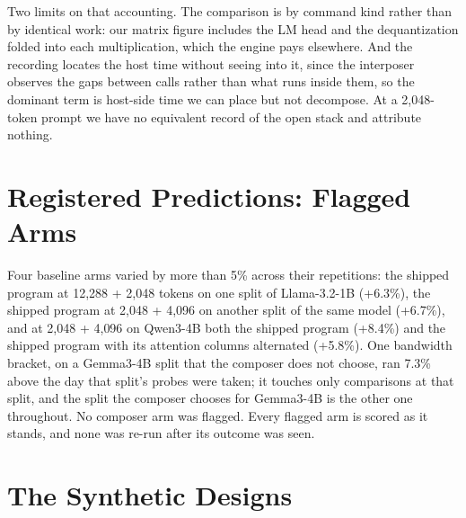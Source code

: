 \documentclass{article}
\begin{document}
Two limits on that accounting. The comparison is by command kind rather than by identical work: our matrix figure
includes the LM head and the dequantization folded into each multiplication, which the engine pays
elsewhere. And the recording locates the host time without seeing into it, since the interposer observes the gaps
between calls rather than what runs inside them, so the dominant term is host-side time we can place but not
decompose. At a 2{,}048-token prompt we have no equivalent record of the open stack and attribute nothing.
\section{Registered Predictions: Flagged Arms}
\label{app:flags}

Four baseline arms varied by more than 5\% across their repetitions: the shipped program at 12{,}288 + 2{,}048 tokens on
one split of Llama-3.2-1B (+6.3\%), the shipped program at 2{,}048 + 4{,}096 on another split of the same model
(+6.7\%), and at 2{,}048 + 4{,}096 on Qwen3-4B both the shipped program (+8.4\%) and the shipped program with its
attention columns alternated (+5.8\%). One bandwidth bracket, on a Gemma3-4B split that the composer does not choose,
ran 7.3\% above the day that split's probes were taken; it touches only comparisons at that split, and the split the
composer chooses for Gemma3-4B is the other one throughout. No composer arm was flagged. Every flagged arm is scored
as it stands, and none was re-run after its outcome was seen.

\section{The Synthetic Designs}
\label{app:synthetic}
\end{document}
